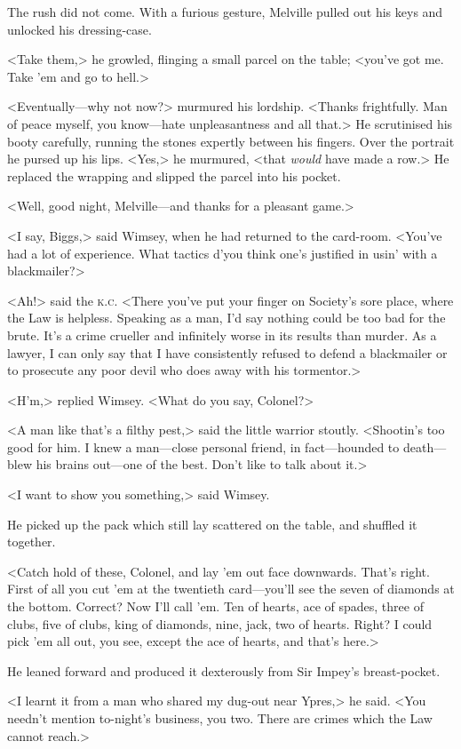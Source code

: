 The rush did not come. With a furious gesture, Melville pulled out his keys and unlocked his dressing-case.

<Take them,> he growled, flinging a small parcel on the table; <you've got me. Take 'em and go to hell.>

<Eventually—why not now?> murmured his lordship. <Thanks frightfully. Man of peace myself, you know—hate unpleasantness and all that.> He scrutinised his booty carefully, running the stones expertly between his fingers. Over the portrait he pursed up his lips. <Yes,> he murmured, <that \textit{would} have made a row.> He replaced the wrapping and slipped the parcel into his pocket.

<Well, good night, Melville—and thanks for a pleasant game.>

<I say, Biggs,> said Wimsey, when he had returned to the card-room. <You've had a lot of experience. What tactics d'you think one's justified in usin' with a blackmailer?>

<Ah!> said the \textsc{k.c.} <There you've put your finger on Society's sore place, where the Law is helpless. Speaking as a man, I'd say nothing could be too bad for the brute. It's a crime crueller and infinitely worse in its results than murder. As a lawyer, I can only say that I have consistently refused to defend a blackmailer or to prosecute any poor devil who does away with his tormentor.>

<H'm,> replied Wimsey. <What do you say, Colonel?>

<A man like that's a filthy pest,> said the little warrior stoutly. <Shootin's too good for him. I knew a man—close personal friend, in fact—hounded to death—blew his brains out—one of the best. Don't like to talk about it.>

<I want to show you something,> said Wimsey.

He picked up the pack which still lay scattered on the table, and shuffled it together.

<Catch hold of these, Colonel, and lay 'em out face downwards. That's right. First of all you cut 'em at the twentieth card—you'll see the seven of diamonds at the bottom. Correct? Now I'll call 'em. Ten of hearts, ace of spades, three of clubs, five of clubs, king of diamonds, nine, jack, two of hearts. Right? I could pick 'em all out, you see, except the ace of hearts, and that's here.>

He leaned forward and produced it dexterously from Sir Impey's breast-pocket.

<I learnt it from a man who shared my dug-out near Ypres,> he said. <You needn't mention to-night's business, you two. There are crimes which the Law cannot reach.>